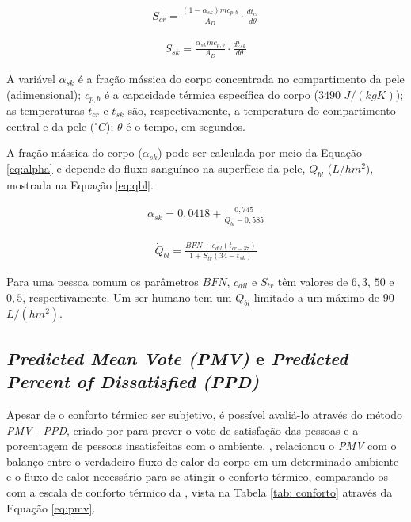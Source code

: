 \documentclass[acronym,symbols,table]{fei}
\begin{document}
\begin{equation} \label{eq:scr}
    \begin{aligned}
   S_{cr}= \frac{(1-\alpha_{sk})mc_{p,b}}{A_{D}}\cdot \frac{dt_{cr}}{d\theta}
    \end{aligned}
\end{equation}

\begin{equation} \label{eq:ssk}
    \begin{aligned}
   S_{sk}= \frac{\alpha_{sk}mc_{p,b}}{A_{D}}\cdot \frac{dt_{sk}}{d\theta} 
    \end{aligned}
\end{equation}

A variável $\alpha_{sk}$ é a fração mássica do corpo concentrada no compartimento da pele (adimensional); $c_{p,b}$ é a capacidade térmica específica do corpo ($3490$ $J/(kgK)$); as temperaturas $t_{cr}$ e $t_{sk}$ são, respectivamente, a temperatura do compartimento central e da pele ($^\circ C$); $\theta$ é o tempo, em segundos.

A fração mássica do corpo ($\alpha_{sk}$) pode ser calculada por meio da Equação \ref{eq:alpha} e depende do fluxo sanguíneo na superfície da pele, $\dot{Q}_{bl}$ ($L/hm^2$), mostrada na Equação \ref{eq:qbl}.  

\begin{equation} \label{eq:alpha}
    \begin{aligned}
    \alpha_{sk}= 0,0418+ \frac{0,745}{\dot{Q}_{bl} - 0,585} 
    \end{aligned}
\end{equation}

\begin{equation} \label{eq:qbl}
    \begin{aligned}
   \dot{Q}_{bl}= \frac{BFN + c_{dil}(t_{cr-37})}{1 + S_{tr}(34-t_{sk})} 
    \end{aligned}
\end{equation}

Para uma pessoa comum os parâmetros $BFN$, $c_{dil}$ e $S_{tr}$ têm valores de $6,3$, $50$ e $0,5$, respectivamente. Um ser humano tem um $\dot{Q}_{bl}$ limitado a um máximo de $90$ $L/(hm^2)$. 

\subsection{\textit{Predicted Mean Vote (PMV)} e \textit{Predicted Percent of Dissatisfied (PPD)}}

Apesar de o conforto térmico ser subjetivo, é possível avaliá-lo através do método \textit{PMV} - \textit{PPD}, criado por \textcite{fanger1970thermal} para prever o voto de satisfação das pessoas e a porcentagem de pessoas insatisfeitas com o ambiente. \textcite{fanger1970thermal}, relacionou o \textit{PMV} com o balanço entre o verdadeiro fluxo de calor do corpo em um determinado ambiente e o fluxo de calor necessário para se atingir o conforto térmico, comparando-os com a escala de conforto térmico da \textcite{ASHRAE2009}, vista na Tabela \ref{tab: conforto} através da Equação \ref{eq:pmv}.
\end{document}
